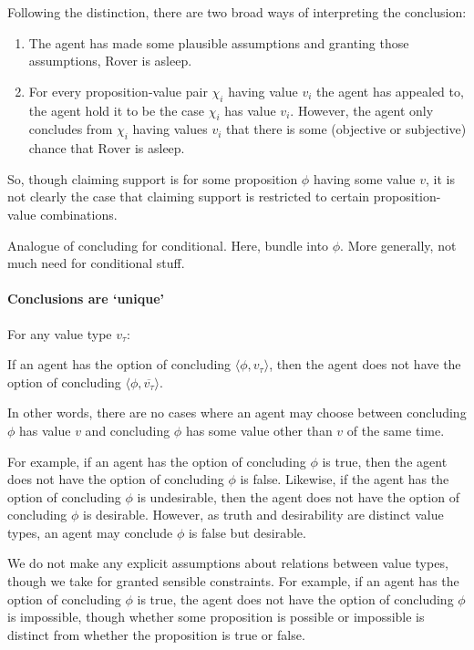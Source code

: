 \begin{note}[Suppositions]
  Following the distinction, there are two broad ways of interpreting the conclusion:
  \begin{enumerate}
  \item
    The agent has made some plausible assumptions and granting those assumptions, Rover is asleep.
  \item
    For every proposition-value pair \(\chi_{i}\) having value \(v_{i}\) the agent has appealed to, the agent hold it to be the case \(\chi_{i}\) has value \(v_{i}\).
    However, the agent only concludes from \(\chi_{i}\) having values \(v_{i}\) that there is some (objective or subjective) chance that Rover is asleep.
  \end{enumerate}
  So, though claiming support is for some proposition \(\phi\) having some value \(v\), it is not clearly the case that claiming support is restricted to certain proposition-value combinations.
\end{note}

\begin{note}[Analogue]
  Analogue of concluding for conditional.
  Here, bundle into \(\phi\).
  More generally, not much need for conditional stuff.
\end{note}

\paragraph*{Conclusions are `unique'}

\begin{note}
  \begin{assumption}
    \label{assu:conc:unique}
    For any value type \(v_{\tau}\):

    If an agent has the option of concluding \(\langle \phi,v_{\tau} \rangle\), then the agent does not have the option of concluding \(\langle \phi,\overline{v_{\tau}} \rangle\).
  \end{assumption}

  In other words, there are no cases where an agent may choose between concluding \(\phi\) has value \(v\) and concluding \(\phi\) has some value other than \(v\) of the same time.

  For example, if an agent has the option of concluding \(\phi\) is true, then the agent does not have the option of concluding \(\phi\) is false.
  Likewise, if the agent has the option of concluding \(\phi\) is undesirable, then the agent does not have the option of concluding \(\phi\) is desirable.
  However, as truth and desirability are distinct value types, an agent may conclude \(\phi\) is false but desirable.

  We do not make any explicit assumptions about relations between value types, though we take for granted sensible constraints.
  For example, if an agent has the option of concluding \(\phi\) is true, the agent does not have the option of concluding \(\phi\) is impossible, though whether some proposition is possible or impossible is distinct from whether the proposition is true or false.
\end{note}


